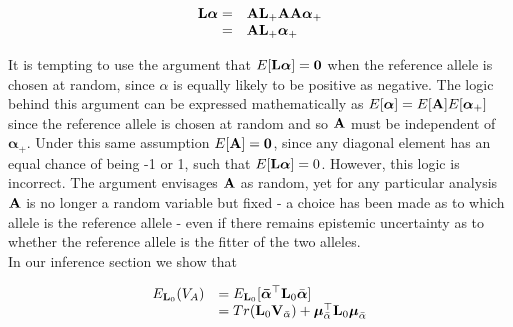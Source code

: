 \documentclass[12pt]{article}
\begin{document}
\begin{bibunit}
\begin{equation}
\begin{array}{rl}
{\bf L}\boldsymbol{\alpha} =& {\bf A}{\bf L}_{+}{\bf A}{\bf A}\boldsymbol{\alpha}_{+}\\
    =& {\bf A}{\bf L}_{+}\boldsymbol{\alpha}_{+}\\
\end{array}
\label{Eq:Lalpha}
\end{equation}

It is tempting to use the argument that $E[{\bf L}\boldsymbol{\alpha}]={\bf 0}$ when the reference allele is chosen at random, since $\alpha$ is equally likely to be positive as negative. The logic behind this argument can be expressed mathematically as $E[\boldsymbol{\alpha}]=E[{\bf A}]E[\boldsymbol{\alpha}_{+}]$ since the reference allele is chosen at random and so ${\bf A}$ must be independent of $\boldsymbol{\alpha}_{+}$. Under this same assumption $E[{\bf A}]={\bf 0}$, since any diagonal element has an equal chance of being -1 or 1, such that $E[{\bf L}\boldsymbol{\alpha}]=0$. However, this logic is incorrect. The argument envisages ${\bf A}$ as random, yet for any particular analysis ${\bf A}$ is no longer a random variable but fixed - a choice has been made as to which allele is the reference allele - even if there remains epistemic uncertainty as to whether the reference allele is the fitter of the two alleles.\\

In our inference section we show that

\begin{equation}
\begin{array}{rl}
E_{\textbf{L}_0}({V_A}) &= E_{\textbf{L}_0}[\boldsymbol{\bar \alpha}^{\top}\textbf{L}_0\bar{\boldsymbol{\alpha}}]\\
&= Tr(\textbf{L}_0{\bf V}_{\bar{\alpha}}) + \boldsymbol{\mu}_{\bar{\alpha}}^{\top}\textbf{L}_0\boldsymbol{\mu}_{\bar{\alpha}}\\
\end{array}
\end{equation}


\end{bibunit}
\end{document}
